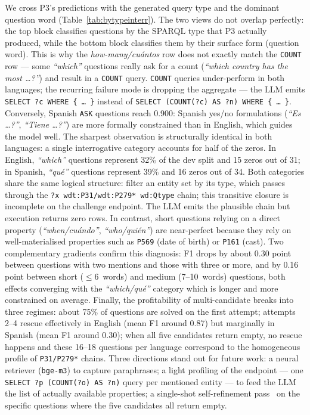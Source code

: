 \documentclass[]{ceurart}
\begin{document}
We cross P3's predictions with the generated query type and the dominant question word (Table~\ref{tab:bytypeinterr}). The two views do not overlap perfectly: the top block classifies questions by the SPARQL type that P3 actually produced, while the bottom block classifies them by their surface form (question word). This is why the \emph{how-many/cu\'antos} row does not exactly match the \texttt{COUNT} row — some \emph{``which''} questions really ask for a count (\emph{``which country has the most \ldots?''}) and result in a \texttt{COUNT} query. \texttt{COUNT} queries under-perform in both languages; the recurring failure mode is dropping the aggregate — the LLM emits \texttt{SELECT ?c WHERE \{~\dots~\}} instead of \texttt{SELECT (COUNT(?c) AS ?n) WHERE \{~\dots~\}}. Conversely, Spanish \texttt{ASK} questions reach 0.900: Spanish yes/no formulations (\emph{``\textnormal{\textquestiondown}Es \ldots?''}, \emph{``\textnormal{\textquestiondown}Tiene \ldots?''}) are more formally constrained than in English, which guides the model well. The sharpest observation is structurally identical in both languages: a single interrogative category accounts for half of the zeros. In English, \emph{``which''} questions represent 32\% of the dev split and 15 zeros out of 31; in Spanish, \emph{``qu\'e''} questions represent 39\% and 16 zeros out of 34. Both categories share the same logical structure: filter an entity set by its type, which passes through the \texttt{?x wdt:P31/wdt:P279* wd:Qtype} chain; this transitive closure is incomplete on the challenge endpoint. The LLM emits the plausible chain but execution returns zero rows. In contrast, short questions relying on a direct property (\emph{``when/cu\'ando''}, \emph{``who/qui\'en''}) are near-perfect because they rely on well-materialised properties such as \texttt{P569} (date of birth) or \texttt{P161} (cast). Two complementary gradients confirm this diagnosis: F1 drops by about 0.30 point between questions with two mentions and those with three or more, and by 0.16 point between short ($\leq 6$~words) and medium (7--10~words) questions, both effects converging with the \emph{``which/qu\'e''} category which is longer and more constrained on average. Finally, the profitability of multi-candidate breaks into three regimes: about 75\% of questions are solved on the first attempt; attempts 2--4 rescue effectively in English (mean F1 around 0.87) but marginally in Spanish (mean F1 around 0.30); when all five candidates return empty, no rescue happens and these 16--18 questions per language correspond to the homogeneous profile of \texttt{P31/P279*} chains. Three directions stand out for future work: a neural retriever (\texttt{bge-m3}) to capture paraphrases; a light profiling of the endpoint — one \texttt{SELECT ?p (COUNT(?o) AS ?n)} query per mentioned entity — to feed the LLM the list of actually available properties; a single-shot self-refinement pass~\cite{madaan2023selfrefine} on the specific questions where the five candidates all return empty.
\end{document}
